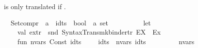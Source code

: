 \begin{isabellebody}
\begin{isamarkuptext}
   is only translated if .%
\end{isamarkuptext}\isamarkuptrue%
\isamarkupfalse%
\isanewline
\ \ {\isachardoublequoteopen}{\isacharunderscore}{\kern0pt}Setcompr{\isachardoublequoteclose}\ {\isacharcolon}{\kern0pt}{\isacharcolon}{\kern0pt}\ {\isachardoublequoteopen}{\isacharprime}{\kern0pt}a\ {\isasymRightarrow}\ idts\ {\isasymRightarrow}\ bool\ {\isasymRightarrow}\ {\isacharprime}{\kern0pt}a\ set{\isachardoublequoteclose}\ \ \ \ {\isacharparenleft}{\kern0pt}{\isachardoublequoteopen}{\isacharparenleft}{\kern0pt}{}{\isacharbraceleft}{\kern0pt}{\isacharunderscore}{\kern0pt}\ {\isacharbar}{\kern0pt}{\isacharslash}{\kern0pt}{\isacharunderscore}{\kern0pt}{\isachardot}{\kern0pt}{\isacharslash}{\kern0pt}\ {\isacharunderscore}{\kern0pt}{\isacharbraceright}{\kern0pt}{\isacharparenright}{\kern0pt}{\isachardoublequoteclose}{\isacharparenright}{\kern0pt}\isanewline
%
\isadelimML
\isanewline
%
\endisadelimML
%
\isatagML
{}\isamarkupfalse%
\ {\isacartoucheopen}\isanewline
\ \ let\isanewline
\ \ \ \ val\ ex{\isacharunderscore}{\kern0pt}tr\ {\isacharequal}{\kern0pt}\ snd\ {\isacharparenleft}{\kern0pt}Syntax{\isacharunderscore}{\kern0pt}Trans{\isachardot}{\kern0pt}mk{\isacharunderscore}{\kern0pt}binder{\isacharunderscore}{\kern0pt}tr\ {\isacharparenleft}{\kern0pt}{\isachardoublequote}{\kern0pt}EX\ {\isachardoublequote}{\kern0pt}{\isacharcomma}{\kern0pt}\ \isactrlconstUNDERSCOREsyntax {\isasymopen}Ex{\isasymclose}{\isacharparenright}{\kern0pt}{\isacharparenright}{\kern0pt}{\isacharsemicolon}{\kern0pt}\isanewline
\isanewline
\ \ \ \ fun\ nvars\ {\isacharparenleft}{\kern0pt}Const\ {\isacharparenleft}{\kern0pt}\isactrlsyntaxUNDERSCOREconst {\isasymopen}{\isacharunderscore}{\kern0pt}idts{\isasymclose}{\isacharcomma}{\kern0pt}\ {\isacharunderscore}{\kern0pt}{\isacharparenright}{\kern0pt}\ {\isachardollar}{\kern0pt}\ {\isacharunderscore}{\kern0pt}\ {\isachardollar}{\kern0pt}\ idts{\isacharparenright}{\kern0pt}\ {\isacharequal}{\kern0pt}\ nvars\ idts\ {\isacharplus}{\kern0pt}\ {}\isanewline
\ \ \ \ \ \ {\isacharbar}{\kern0pt}\ nvars\ {\isacharunderscore}{\kern0pt}\ {\isacharequal}{\kern0pt}\ {}{\isacharsemicolon}{\kern0pt}\isanewline

\end{isabellebody}
